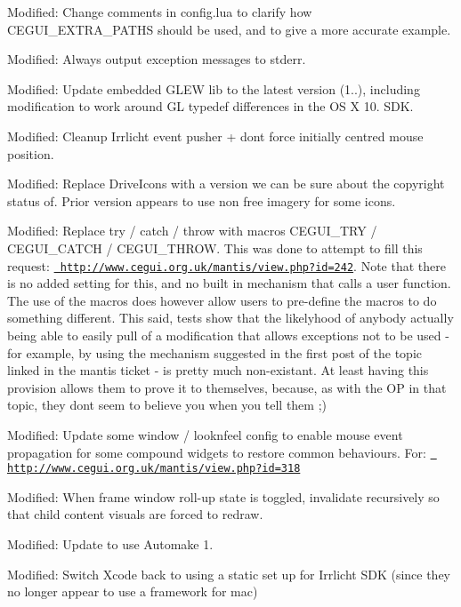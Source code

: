 \begin{DoxyItemize}
\item Modified\+: Change comments in config.\+lua to clarify how C\+E\+G\+U\+I\+\_\+\+E\+X\+T\+R\+A\+\_\+\+P\+A\+T\+HS should be used, and to give a more accurate example.
\item Modified\+: Always output exception messages to stderr.
\item Modified\+: Update embedded G\+L\+EW lib to the latest version (1..), including modification to work around GL typedef differences in the OS X 10. S\+DK.
\item Modified\+: Cleanup Irrlicht event pusher + don\textquotesingle{}t force initially centred mouse position.
\item Modified\+: Replace Drive\+Icons with a version we can be sure about the copyright status of. Prior version appears to use non free imagery for some icons.
\item Modified\+: Replace try / catch / throw with macros C\+E\+G\+U\+I\+\_\+\+T\+RY / C\+E\+G\+U\+I\+\_\+\+C\+A\+T\+CH / C\+E\+G\+U\+I\+\_\+\+T\+H\+R\+OW. This was done to attempt to fill this request\+: \href{http://www.cegui.org.uk/mantis/view.php?id=242}{\texttt{ http\+://www.\+cegui.\+org.\+uk/mantis/view.\+php?id=242}}. Note that there is no added setting for this, and no \textquotesingle{}built in\textquotesingle{} mechanism that calls a user function. The use of the macros does however allow users to pre-\/define the macros to do something different. This said, tests show that the likelyhood of anybody actually being able to easily pull of a modification that allows exceptions not to be used -\/ for example, by using the mechanism suggested in the first post of the topic linked in the mantis ticket -\/ is pretty much non-\/existant. At least having this provision allows them to prove it to themselves, because, as with the OP in that topic, they don\textquotesingle{}t seem to believe you when you tell them ;)
\item Modified\+: Update some window / looknfeel config to enable mouse event propagation for some compound widgets to restore common behaviours. For\+: \href{http://www.cegui.org.uk/mantis/view.php?id=318}{\texttt{ http\+://www.\+cegui.\+org.\+uk/mantis/view.\+php?id=318}}
\item Modified\+: When frame window roll-\/up state is toggled, invalidate recursively so that child content visuals are forced to redraw.
\item Modified\+: Update to use Automake 1.
\item Modified\+: Switch Xcode back to using a static set up for Irrlicht S\+DK (since they no longer appear to use a framework for mac)

\end{DoxyItemize}
